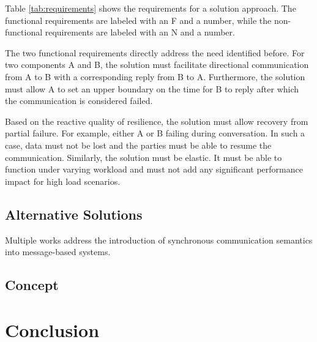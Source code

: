 Table \ref{tab:requirements} shows the requirements for a solution approach.
The functional requirements are labeled with an F and a number, while the non-functional requirements are labeled with an N and a number.

The two functional requirements directly address the need identified before.
For two components A and B, the solution must facilitate directional communication from A to B with a corresponding reply from B to A.
Furthermore, the solution must allow A to set an upper boundary on the time for B to reply after which the communication is considered failed.

Based on the reactive quality of resilience, the solution must allow recovery from partial failure.
For example, either A or B failing during conversation.
In such a case, data must not be lost and the parties must be able to resume the communication.
Similarly, the solution must be elastic.
It must be able to function under varying workload and must not add any significant performance impact for high load scenarios.

\subsection{Alternative Solutions}

Multiple works address the introduction of synchronous communication semantics into message-based systems.


\subsection{Concept}


\clearpage
\section{Conclusion}\label{sec:conclusion}
